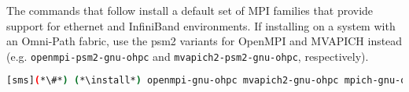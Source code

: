 \noindent The commands that follow install a default set of MPI families that
provide support for ethernet and InfiniBand environments. If installing on a
system with an \IntelR{} Omni-Path fabric, use the {psm2} variants for
OpenMPI and MVAPICH instead (e.g. \texttt{openmpi-psm2-gnu-ohpc}
and \texttt{mvapich2-psm2-gnu-ohpc}, respectively).

\begin{lstlisting}[language=bash]
[sms](*\#*) (*\install*) openmpi-gnu-ohpc mvapich2-gnu-ohpc mpich-gnu-ohpc
\end{lstlisting}



